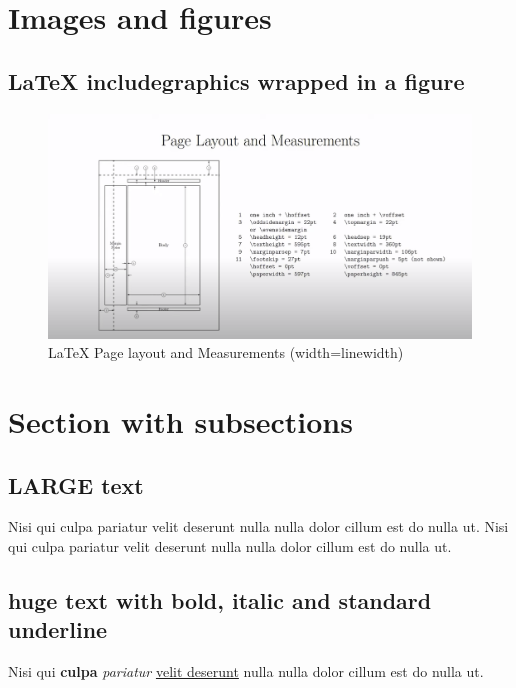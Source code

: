 \documentclass[12pt]{article}
\begin{document}
\newpage

\tableofcontents
\listoffigures
\listoftables
\setcounter{section}{8}

\newpage

\section{Images and figures}

\subsection{LaTeX includegraphics wrapped in a figure}
\begin{figure}[ht!]
    \centering
    \includegraphics[width=\linewidth]{page_layout.png}
    \caption{LaTeX Page layout and Measurements (width=linewidth)}
    \label{hr_3}
\end{figure}

\section{Section with subsections}

\subsection{LARGE text}
{\LARGE \indent Nisi qui culpa pariatur velit deserunt nulla nulla dolor cillum est do nulla ut. Nisi qui culpa pariatur velit deserunt nulla nulla dolor cillum est do nulla ut.}

\subsection{huge text with bold, italic and standard underline}
{\huge \indent Nisi qui \textbf{culpa} \textit{pariatur} \underline{velit deserunt} nulla nulla dolor cillum est do nulla ut.} \\
\end{document}
